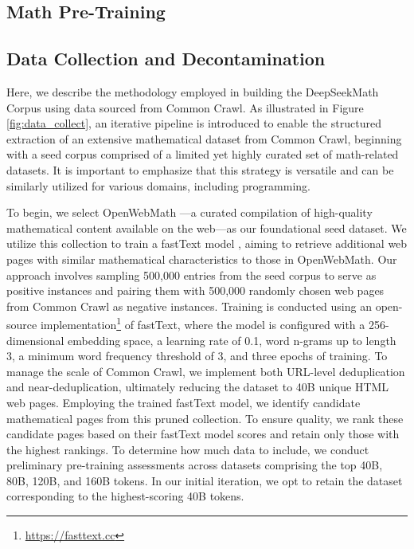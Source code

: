 \begin{itemize}[topsep=0pt]
\section{Math Pre-Training}

\subsection{Data Collection and Decontamination} Here, we describe the methodology employed in building the DeepSeekMath Corpus using data sourced from Common Crawl. As illustrated in Figure \ref{fig:data_collect}, an iterative pipeline is introduced to enable the structured extraction of an extensive mathematical dataset from Common Crawl, beginning with a seed corpus comprised of a limited yet highly curated set of math-related datasets. It is important to emphasize that this strategy is versatile and can be similarly utilized for various domains, including programming.

To begin, we select OpenWebMath \citep{openwebmath}—a curated compilation of high-quality mathematical content available on the web—as our foundational seed dataset. We utilize this collection to train a fastText model \citep{joulin2016fasttext}, aiming to retrieve additional web pages with similar mathematical characteristics to those in OpenWebMath. Our approach involves sampling 500,000 entries from the seed corpus to serve as positive instances and pairing them with 500,000 randomly chosen web pages from Common Crawl as negative instances. Training is conducted using an open-source implementation\footnote{\url{https://fasttext.cc}} of fastText, where the model is configured with a 256-dimensional embedding space, a learning rate of 0.1, word n-grams up to length 3, a minimum word frequency threshold of 3, and three epochs of training. To manage the scale of Common Crawl, we implement both URL-level deduplication and near-deduplication, ultimately reducing the dataset to 40B unique HTML web pages. Employing the trained fastText model, we identify candidate mathematical pages from this pruned collection. To ensure quality, we rank these candidate pages based on their fastText model scores and retain only those with the highest rankings. To determine how much data to include, we conduct preliminary pre-training assessments across datasets comprising the top 40B, 80B, 120B, and 160B tokens. In our initial iteration, we opt to retain the dataset corresponding to the highest-scoring 40B tokens.


\end{itemize}
